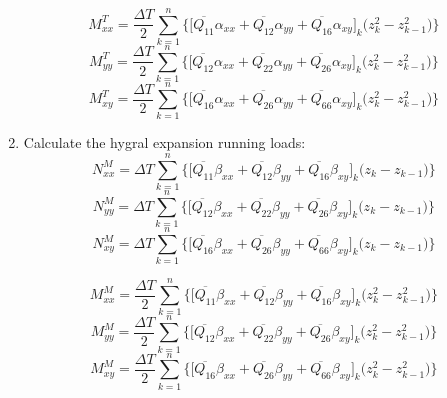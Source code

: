 \documentclass{article}
\begin{document}
\begin{enumerate}
    \begin{equation}
        M_{xx}^{T} = \frac{\Delta T}{2} \sum_{k=1}^{n} \Big\{\big[\overline{Q_{11}}\alpha_{xx} + \overline{Q_{12}}\alpha_{yy} + \overline{Q_{16}}\alpha_{xy}\big]_{k}\big(z_{k}^{2} - z_{k-1}^{2}\big)\Big\}
    \end{equation}
    \begin{equation}
        M_{yy}^{T} = \frac{\Delta T}{2} \sum_{k=1}^{n} \Big\{\big[\overline{Q_{12}}\alpha_{xx} + \overline{Q_{22}}\alpha_{yy} + \overline{Q_{26}}\alpha_{xy}\big]_{k}\big(z_{k}^{2} - z_{k-1}^{2}\big)\Big\}
    \end{equation}
    \begin{equation}
        M_{xy}^{T} = \frac{\Delta T}{2} \sum_{k=1}^{n} \Big\{\big[\overline{Q_{16}}\alpha_{xx} + \overline{Q_{26}}\alpha_{yy} + \overline{Q_{66}}\alpha_{xy}\big]_{k}\big(z_{k}^{2} - z_{k-1}^{2}\big)\Big\}
    \end{equation}

    \item Calculate the hygral expansion running loads:
    \begin{equation}
        N_{xx}^{M} = \Delta T \sum_{k=1}^{n} \Big\{\big[\overline{Q_{11}}\beta_{xx} + \overline{Q_{12}}\beta_{yy} + \overline{Q_{16}}\beta_{xy}\big]_{k}\big(z_{k} - z_{k-1}\big)\Big\}
    \end{equation}
    \begin{equation}
        N_{yy}^{M} = \Delta T \sum_{k=1}^{n} \Big\{\big[\overline{Q_{12}}\beta_{xx} + \overline{Q_{22}}\beta_{yy} + \overline{Q_{26}}\beta_{xy}\big]_{k}\big(z_{k} - z_{k-1}\big)\Big\}
    \end{equation}
    \begin{equation}
        N_{xy}^{M} = \Delta T \sum_{k=1}^{n} \Big\{\big[\overline{Q_{16}}\beta_{xx} + \overline{Q_{26}}\beta_{yy} + \overline{Q_{66}}\beta_{xy}\big]_{k}\big(z_{k} - z_{k-1}\big)\Big\}
    \end{equation}

    \begin{equation}
        M_{xx}^{M} = \frac{\Delta T}{2} \sum_{k=1}^{n} \Big\{\big[\overline{Q_{11}}\beta_{xx} + \overline{Q_{12}}\beta_{yy} + \overline{Q_{16}}\beta_{xy}\big]_{k}\big(z_{k}^{2} - z_{k-1}^{2}\big)\Big\}
    \end{equation}
    \begin{equation}
        M_{yy}^{M} = \frac{\Delta T}{2} \sum_{k=1}^{n} \Big\{\big[\overline{Q_{12}}\beta_{xx} + \overline{Q_{22}}\beta_{yy} + \overline{Q_{26}}\beta_{xy}\big]_{k}\big(z_{k}^{2} - z_{k-1}^{2}\big)\Big\}
    \end{equation}
    \begin{equation}
        M_{xy}^{M} = \frac{\Delta T}{2} \sum_{k=1}^{n} \Big\{\big[\overline{Q_{16}}\beta_{xx} + \overline{Q_{26}}\beta_{yy} + \overline{Q_{66}}\beta_{xy}\big]_{k}\big(z_{k}^{2} - z_{k-1}^{2}\big)\Big\}
    \end{equation}


\end{enumerate}
\end{document}
